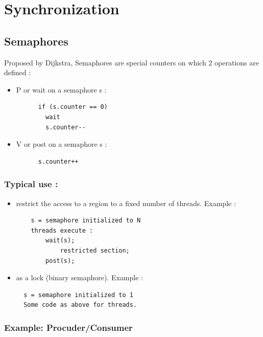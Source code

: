 \chapter{Synchronization}
\section{Semaphores}

Proposed by Dijkstra, Semaphores are special counters on which 2 operations are defined :
\begin{itemize}
  \item P or wait on a semaphore s :
    \begin{verbatim}
      if (s.counter == 0)
        wait
        s.counter--
    \end{verbatim}
  \item V or post on a semaphore s :
  \begin{verbatim}
      s.counter++
  \end{verbatim}
\end{itemize}

\subsection{Typical use :} 

\begin{itemize}
  
\item restrict the access to a region to a fixed number of threads.
Example :

\begin{verbatim}
    s = semaphore initialized to N
    threads execute :
        wait(s);
            restricted section;
        post(s);
\end{verbatim}

\item as a lock (binary semaphore).
Example :
\begin{verbatim}
  s = semaphore initialized to 1
  Some code as above for threads.
\end{verbatim}
\end{itemize}

\subsection{Example: Procuder/Consumer}

